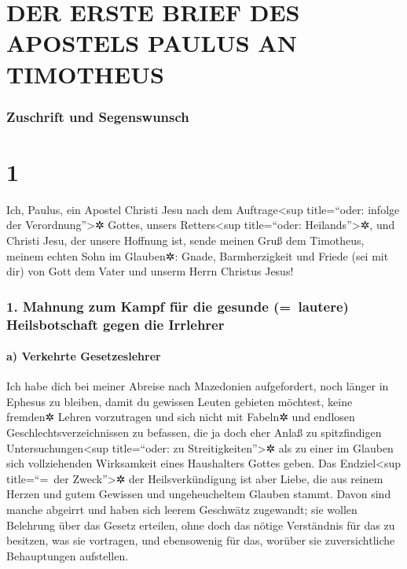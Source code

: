 \hypertarget{der-erste-brief-des-apostels-paulus-an-timotheus}{%
\section{DER ERSTE BRIEF DES APOSTELS PAULUS AN
TIMOTHEUS}\label{der-erste-brief-des-apostels-paulus-an-timotheus}}

\hypertarget{zuschrift-und-segenswunsch}{%
\subsubsection{Zuschrift und
Segenswunsch}\label{zuschrift-und-segenswunsch}}

\hypertarget{section}{%
\section{1}\label{section}}

 Ich, Paulus, ein Apostel Christi Jesu nach dem
Auftrage\textless sup title=``oder: infolge der
Verordnung''\textgreater✲ Gottes, unsers Retters\textless sup
title=``oder: Heilands''\textgreater✲, und Christi Jesu, der unsere
Hoffnung ist,  sende meinen Gruß dem Timotheus, meinem
echten Sohn im Glauben✲: Gnade, Barmherzigkeit und Friede (sei mit dir)
von Gott dem Vater und unserm Herrn Christus Jesus!

\hypertarget{mahnung-zum-kampf-fuxfcr-die-gesunde-lautere-heilsbotschaft-gegen-die-irrlehrer}{%
\subsubsection{1. Mahnung zum Kampf für die gesunde (=~lautere)
Heilsbotschaft gegen die
Irrlehrer}\label{mahnung-zum-kampf-fuxfcr-die-gesunde-lautere-heilsbotschaft-gegen-die-irrlehrer}}

\hypertarget{a-verkehrte-gesetzeslehrer}{%
\paragraph{a) Verkehrte
Gesetzeslehrer}\label{a-verkehrte-gesetzeslehrer}}

 Ich habe dich bei meiner Abreise nach Mazedonien
aufgefordert, noch länger in Ephesus zu bleiben, damit du gewissen
Leuten gebieten möchtest, keine fremden✲ Lehren vorzutragen
 und sich nicht mit Fabeln✲ und endlosen
Geschlechtsverzeichnissen zu befassen, die ja doch eher Anlaß zu
spitzfindigen Untersuchungen\textless sup title=``oder: zu
Streitigkeiten''\textgreater✲ als zu einer im Glauben sich vollziehenden
Wirksamkeit eines Haushalters Gottes geben.  Das
Endziel\textless sup title=``=~der Zweck''\textgreater✲ der
Heilsverkündigung ist aber Liebe, die aus reinem Herzen und gutem
Gewissen und ungeheucheltem Glauben stammt.  Davon sind
manche abgeirrt und haben sich leerem Geschwätz zugewandt;
 sie wollen Belehrung über das Gesetz erteilen, ohne doch
das nötige Verständnis für das zu besitzen, was sie vortragen, und
ebensowenig für das, worüber sie zuversichtliche Behauptungen
aufstellen.

